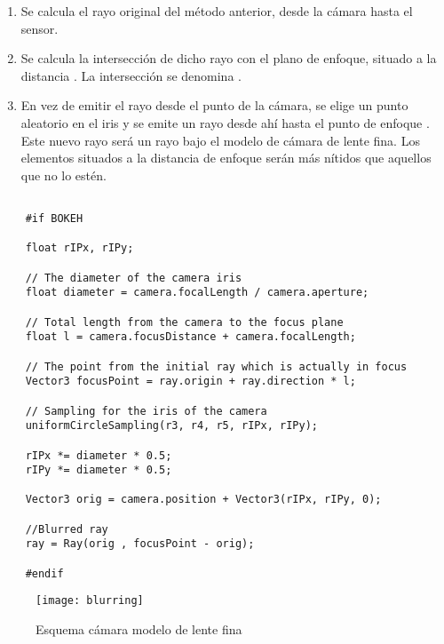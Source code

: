 \begin{enumerate}
		
\item Se calcula el rayo original del método anterior, desde la cámara hasta el sensor.

\item Se calcula la intersección de dicho rayo con el plano de enfoque, situado a la distancia . La intersección se denomina .
	
\item En vez de emitir el rayo desde el punto de la cámara, se elige un punto aleatorio en el iris  y se emite un rayo desde ahí hasta el punto de enfoque . Este nuevo rayo será un rayo bajo el modelo de cámara de lente fina. Los elementos situados a la distancia de enfoque  serán más nítidos que aquellos que no lo estén.
	
\end{enumerate}

\begin{minipage}[c]{0.95\textwidth}
\begin{lstlisting}[label={cod:bokeh}, caption={Código de desenfoque}]
	
	#if BOKEH
	
    float rIPx, rIPy;

    // The diameter of the camera iris
    float diameter = camera.focalLength / camera.aperture;

    // Total length from the camera to the focus plane
    float l = camera.focusDistance + camera.focalLength;

    // The point from the initial ray which is actually in focus
    Vector3 focusPoint = ray.origin + ray.direction * l;

    // Sampling for the iris of the camera
    uniformCircleSampling(r3, r4, r5, rIPx, rIPy);

    rIPx *= diameter * 0.5;
    rIPy *= diameter * 0.5;

    Vector3 orig = camera.position + Vector3(rIPx, rIPy, 0);

    //Blurred ray
    ray = Ray(orig , focusPoint - orig);

	#endif 

\end{lstlisting}
\end{minipage}

\begin{figure}[H]
	\centering
	\texttt{[image: blurring]}
	\caption{Esquema cámara modelo de lente fina}
	\label{fig:thinlensecamera}
\end{figure}

